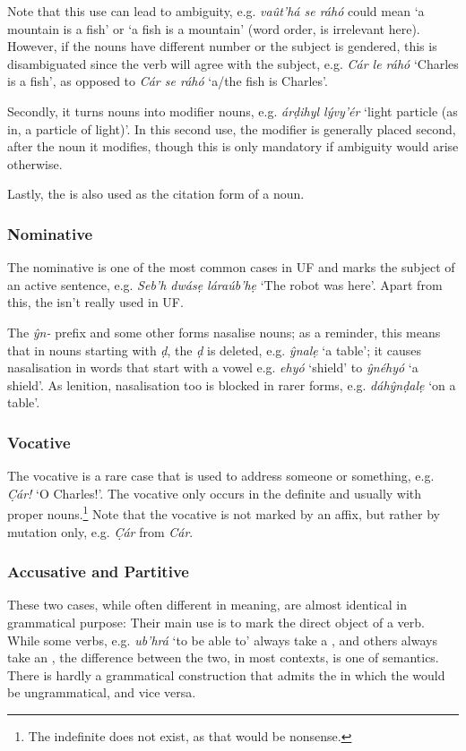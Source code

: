\documentclass[a4paper, 12pt, twoside, final]{article}
\let \w \textit
\begin{document}
Note that this use can lead to ambiguity, e.g. \w{vaût’há se ráhó} could mean ‘a mountain is a fish’ or ‘a fish is a
mountain’ (word order, is irrelevant here). However, if the nouns have different number or the subject is gendered,
this is disambiguated since the verb will agree with the subject, e.g. \w{Cár le ráhó} ‘Charles is a fish’, as opposed to
\w{Cár se ráhó} ‘a/the fish is Charles’.

Secondly, it turns nouns into modifier nouns, e.g.
\w{árḍihyl lývy’ér} ‘light particle (as in, a particle of light)’. In this second use, the modifier is generally
placed second, after the noun it modifies, though this is only mandatory if ambiguity would arise otherwise.

Lastly, the  is also used as the citation form of a noun.

\subsubsection{Nominative}
The nominative is one of the most common cases in UF and marks the subject of an active sentence, e.g.
\w{Seb’h dwásẹ láraúb’hẹ} ‘The robot was here’. Apart from this, the  isn’t really used in UF.

The  \w{ŷn-} prefix and some other forms nasalise nouns; as a reminder, this means that in
nouns starting with \w{ḍ}, the \w{ḍ} is deleted, e.g. \w{ŷnalẹ} ‘a table’; it causes nasalisation in words
that start with a vowel e.g. \w{ehyó} ‘shield’ to \w{ŷnéhyó} ‘a shield’. As lenition, nasalisation too is
blocked in rarer forms, e.g.  \w{dáhŷnḍalẹ} ‘on a table’.

\subsubsection{Vocative}
The vocative is a rare case that is used to address someone or something, e.g. \w{C̣ár!} ‘O Charles!’. The vocative
only occurs in the definite and usually with proper nouns.\footnote{The indefinite 
does not exist, as that would be nonsense.} Note that the vocative is not marked by an affix, but
rather by mutation only, e.g. \w{C̣ár} from \w{Cár}.

\subsubsection{Accusative and Partitive}
These two cases, while often different in meaning, are almost identical in grammatical purpose: Their main use is to
mark the direct object of a verb. While some verbs, e.g. \w{ub’hrá} ‘to be
able to’ always take a , and others always take an , the difference between the two, in most contexts,
is one of semantics. There is hardly a grammatical construction that admits the  in which the  would be
ungrammatical, and vice versa.
\end{document}
